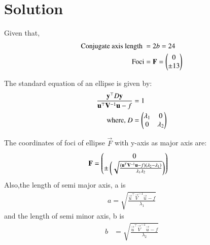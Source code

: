\documentclass[journal,12pt,twocolumn]{IEEEtran}
\begin{document}
\section{Solution}
Given that,
\begin{align}
\text{Conjugate axis length }&= 2b = 24 \label{eqA}
  \\
\text{Foci}&=\mathbf{F} = \begin{pmatrix}0\\\pm13\end{pmatrix} \label{eqb}
\end{align}
\begin{lemma}
\label{lemma}
The standard equation of an ellipse is given by:
\begin{align}
\frac{\mathbf{y}^{\top}D\mathbf{y}}{\mathbf{u}^{\top}\mathbf{V}^{-1}\mathbf{u}-f}&=1
\\
\text{where, } D &=\begin{pmatrix}\lambda_1& 0 \\ 0 & \lambda_2\end{pmatrix}
\end{align}
\end{lemma}
\begin{lemma}
The coordinates of foci of ellipse $\vec{F}$ with y-axis as major axis are:
 \begin{align}
  \mathbf{F} &= \begin{pmatrix}0\\ \pm \left(\sqrt{\frac{(\mathbf{u}^T\mathbf{V}^{-1}\mathbf{u}-f)(\lambda_2-\lambda_1)}{\lambda_1\lambda_2}}\right)\end{pmatrix} \label{eqZ}
\end{align}
Also,the length of semi major axis, a is
\begin{align}
  a = \sqrt{\frac{\vec{u}^{\top}\vec{V}^{-1}\vec{u}-f}{\lambda_1}} \label{eq1}
  \end{align}
and the length of semi minor axis, b is
  \begin{align}
  b &= \sqrt{\frac{\vec{u}^{\top}\vec{V}^{-1}\vec{u}-f}{\lambda_2}}
 \end{align}
\end{lemma}
\end{document}

